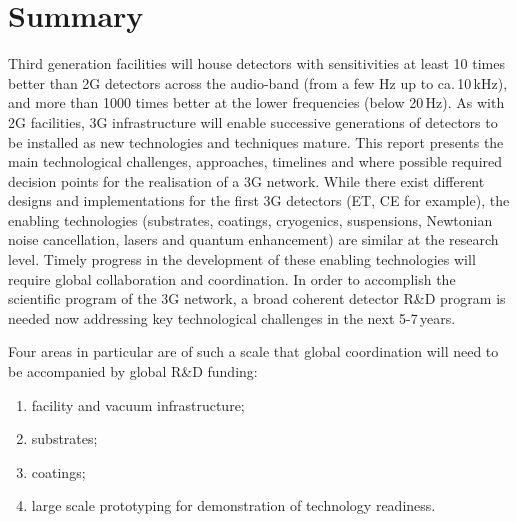\chapter{Summary}
\label{sec:Summary}


Third generation facilities will house detectors with sensitivities at least 10 times better than 2G detectors across the audio-band (from a few Hz up to  ca.\,10\,kHz), and more than 1000 times better at the lower frequencies (below 20\,Hz). As with 2G facilities, 3G infrastructure will enable successive generations of detectors to be installed as new technologies and techniques mature.  This report presents the main technological challenges, approaches, timelines and where possible required decision points for the realisation of a 3G network. While there exist different designs and implementations for the first 3G detectors (ET, CE for example), the enabling technologies (substrates, coatings, cryogenics, suspensions, Newtonian noise cancellation, lasers and quantum enhancement) are similar at the research level.  Timely progress in the development of these enabling technologies will require global collaboration and coordination. In order to accomplish the scientific program of the 3G network, a broad coherent detector R\&D program is needed now addressing key technological challenges in the next 5-7\,years.   

Four areas in particular are of such a scale that global coordination will need to be accompanied by global R\&D funding: 

\begin{enumerate}
\item facility and vacuum infrastructure; 
\item substrates; 
\item coatings; 
\item large scale prototyping for demonstration of technology readiness. 
\end{enumerate}

